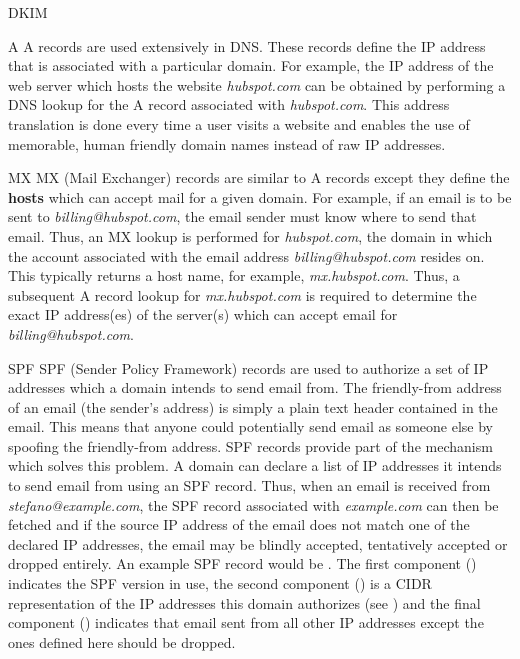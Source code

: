 \begin{labeling}{DKIM }
  \item[A] A records are used extensively in DNS. These records define the IP address that is associated with a particular domain. For example, the IP address of the web server which hosts the website \textit{hubspot.com} can be obtained by performing a DNS lookup for the A record associated with \textit{hubspot.com}. This address translation is done every time a user visits a website and enables the use of memorable, human friendly domain names instead of raw IP addresses.
  \item[MX] MX (Mail Exchanger) records are similar to A records except they define the \textbf{hosts} which can accept mail for a given domain. For example, if an email is to be sent to \textit{billing@hubspot.com}, the email sender must know where to send that email. Thus, an MX lookup is performed for \textit{hubspot.com}, the domain in which the account associated with the email address \textit{billing@hubspot.com} resides on. This typically returns a host name, for example, \textit{mx.hubspot.com}. Thus, a subsequent A record lookup for \textit{mx.hubspot.com} is required to determine the exact IP address(es) of the server(s) which can accept email for \textit{billing@hubspot.com}.
  \item[SPF] SPF (Sender Policy Framework) records are used to authorize a set of IP addresses which a domain intends to send email from. The friendly-from address of an email (the sender's address) is simply a plain text header contained in the email. This means that anyone could potentially send email as someone else by spoofing the friendly-from address. SPF records provide part of the mechanism which solves this problem. A domain can declare a list of IP addresses it intends to send email from using an SPF record. Thus, when an email is received from \textit{stefano@example.com}, the SPF record associated with \textit{example.com} can then be fetched and if the source IP address of the email does not match one of the declared IP addresses, the email may be blindly accepted, tentatively accepted or dropped entirely. An example SPF record would be . The first component () indicates the SPF version in use, the second component () is a CIDR representation of the IP addresses this domain authorizes (see ) and the final component () indicates that email sent from all other IP addresses except the ones defined here should be dropped. 

\end{labeling}
